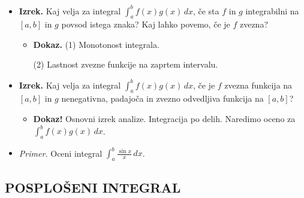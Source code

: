 \begin{enumerate}
\begin{itemize}
\begin{itemize}
            (2) Lastnost zvezne funkcije na zaprtem intervalu.
        \end{itemize}
        \item \colorbox{blue!30}{\textbf{Izrek.}} Kaj velja za integral $\displaystyle \int_{a}^{b} f(x)g(x)  \,dx $, če sta $f$ in $g$ integrabilni na $[a,b]$ in $g$ povsod istega znaka? Kaj lahko povemo, če je $f$ zvezna? 
        \begin{itemize}
            \item \colorbox{green!30}{\textbf{Dokaz.}} (1) Monotonost integrala.
            
            (2) Lastnost zvezne funkcije na zaprtem intervalu.
        \end{itemize}
        \item \colorbox{blue!30}{\textbf{Izrek.}}  Kaj velja za integral $\displaystyle \int_{a}^{b} f(x)g(x)  \,dx $, če je $f$ zvezna funkcija na $[a,b]$ in $g$ nenegativna, padajoča in zvezno odvedljiva funkcija na $[a,b]$?
        \begin{itemize}
            \item \colorbox{green!50}{\textbf{Dokaz!}} Osnovni izrek analize. Integracija po delih.             
            Naredimo oceno za $\int_{a}^{b} f(x) g(x) \, dx$.
        \end{itemize}
        \item \colorbox{yellow!30}{\emph{Primer.}} Oceni integral $\displaystyle \int_{a}^{b} \frac{\sin x}{x} \,dx $.
    \end{itemize}
\end{enumerate}

\subsection{POSPLOŠENI INTEGRAL}

